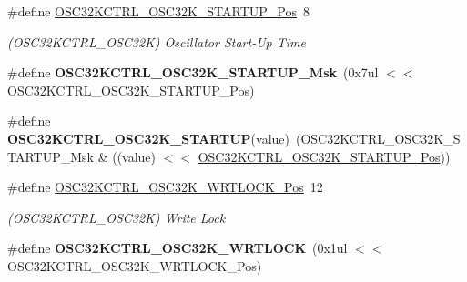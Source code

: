 \begin{DoxyCompactItemize}
\item 
\hypertarget{group___s_a_m_l21___o_s_c32_k_c_t_r_l_ga439291269e6ece8bdfbddebc49c21555}{}\#define \hyperlink{group___s_a_m_l21___o_s_c32_k_c_t_r_l_ga439291269e6ece8bdfbddebc49c21555}{O\+S\+C32\+K\+C\+T\+R\+L\+\_\+\+O\+S\+C32\+K\+\_\+\+S\+T\+A\+R\+T\+U\+P\+\_\+\+Pos}~8\label{group___s_a_m_l21___o_s_c32_k_c_t_r_l_ga439291269e6ece8bdfbddebc49c21555}

\begin{DoxyCompactList}\small\item\em (O\+S\+C32\+K\+C\+T\+R\+L\+\_\+\+O\+S\+C32\+K) Oscillator Start-\/\+Up Time \end{DoxyCompactList}\item 
\hypertarget{group___s_a_m_l21___o_s_c32_k_c_t_r_l_ga5416ae717ce31ef020cc4530afe12600}{}\#define {\bfseries O\+S\+C32\+K\+C\+T\+R\+L\+\_\+\+O\+S\+C32\+K\+\_\+\+S\+T\+A\+R\+T\+U\+P\+\_\+\+Msk}~(0x7ul $<$$<$ O\+S\+C32\+K\+C\+T\+R\+L\+\_\+\+O\+S\+C32\+K\+\_\+\+S\+T\+A\+R\+T\+U\+P\+\_\+\+Pos)\label{group___s_a_m_l21___o_s_c32_k_c_t_r_l_ga5416ae717ce31ef020cc4530afe12600}

\item 
\hypertarget{group___s_a_m_l21___o_s_c32_k_c_t_r_l_ga326f2ab8e98fb84c6de284f88010f48a}{}\#define {\bfseries O\+S\+C32\+K\+C\+T\+R\+L\+\_\+\+O\+S\+C32\+K\+\_\+\+S\+T\+A\+R\+T\+U\+P}(value)~(O\+S\+C32\+K\+C\+T\+R\+L\+\_\+\+O\+S\+C32\+K\+\_\+\+S\+T\+A\+R\+T\+U\+P\+\_\+\+Msk \& ((value) $<$$<$ \hyperlink{group___s_a_m_l21___o_s_c32_k_c_t_r_l_ga439291269e6ece8bdfbddebc49c21555}{O\+S\+C32\+K\+C\+T\+R\+L\+\_\+\+O\+S\+C32\+K\+\_\+\+S\+T\+A\+R\+T\+U\+P\+\_\+\+Pos}))\label{group___s_a_m_l21___o_s_c32_k_c_t_r_l_ga326f2ab8e98fb84c6de284f88010f48a}

\item 
\hypertarget{group___s_a_m_l21___o_s_c32_k_c_t_r_l_gac1aa6cd9b729dc9d458aa9e1ffa75121}{}\#define \hyperlink{group___s_a_m_l21___o_s_c32_k_c_t_r_l_gac1aa6cd9b729dc9d458aa9e1ffa75121}{O\+S\+C32\+K\+C\+T\+R\+L\+\_\+\+O\+S\+C32\+K\+\_\+\+W\+R\+T\+L\+O\+C\+K\+\_\+\+Pos}~12\label{group___s_a_m_l21___o_s_c32_k_c_t_r_l_gac1aa6cd9b729dc9d458aa9e1ffa75121}

\begin{DoxyCompactList}\small\item\em (O\+S\+C32\+K\+C\+T\+R\+L\+\_\+\+O\+S\+C32\+K) Write Lock \end{DoxyCompactList}\item 
\hypertarget{group___s_a_m_l21___o_s_c32_k_c_t_r_l_ga4f7914000cae4ff1750fd9a370cabb05}{}\#define {\bfseries O\+S\+C32\+K\+C\+T\+R\+L\+\_\+\+O\+S\+C32\+K\+\_\+\+W\+R\+T\+L\+O\+C\+K}~(0x1ul $<$$<$ O\+S\+C32\+K\+C\+T\+R\+L\+\_\+\+O\+S\+C32\+K\+\_\+\+W\+R\+T\+L\+O\+C\+K\+\_\+\+Pos)\label{group___s_a_m_l21___o_s_c32_k_c_t_r_l_ga4f7914000cae4ff1750fd9a370cabb05}


\end{DoxyCompactItemize}
